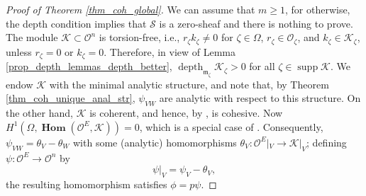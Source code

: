 \documentclass{amsart}
\numberwithin{equation}{section}
\theoremstyle{definition}
\theoremstyle{plain}
\theoremstyle{remark}
\begin{document}
\begin{proof}[Proof of Theorem \ref{thm_coh_global}]
We can assume that $m\geq 1$, for otherwise, the depth condition implies that ${\ensuremath{\mathcal{{S}}}}$ is a zero-sheaf and there is
nothing to prove.
The module 
${\ensuremath{\mathcal{{K}}}}\subset{\ensuremath{\mathcal{{O}}}}^n$ is torsion-free, i.e., 
$r_\zeta k_\zeta\not=0$
for $\zeta\in\Omega$, $r_\zeta\in{\ensuremath{\mathcal{{O}}}}_\zeta$, and $k_\zeta\in{\ensuremath{\mathcal{{K}}}}_\zeta$,
unless $r_\zeta=0$ or $k_\zeta=0$. Therefore, 
in view of 
Lemma \ref{prop_depth_lemmas_depth_better},
${\mathop{\mathrm{depth}}\nolimits _{{{{\mathop{\mathfrak{m}}}}_\zeta}}} {\ensuremath{\mathcal{{K}}}}_\zeta>0$ for all $\zeta\in{\mathop{\mathrm{supp}}} {\ensuremath{\mathcal{{K}}}}$.
We endow ${\ensuremath{\mathcal{{K}}}}$ with the minimal analytic structure, and note that, 
 by Theorem 
\ref{thm_coh_unique_anal_str},
$\psi_{VW}$ are analytic with respect to this structure.
On the other hand, ${\ensuremath{\mathcal{{K}}}}$ is coherent, and hence, by \cite[Theorem 4.3]{Lempert}, is cohesive. 
Now
$H^1(\Omega,{{\mathop{\mathbf{Hom}}}}({\ensuremath{\mathcal{{O}}}}^E,{\ensuremath{\mathcal{{K}}}}))=0$,
which is a special case of \cite[Theorem 9.1]{LP}.
Consequently,
$\psi_{VW}=\theta_V-\theta_W$ with some (analytic)
homomorphisms $\theta_V:{\ensuremath{\mathcal{{O}}}}^E|_V\rightarrow{\ensuremath{\mathcal{{K}}}}|_V$;
defining $\psi:{\ensuremath{\mathcal{{O}}}}^E\rightarrow{\ensuremath{\mathcal{{O}}}}^n$ by
\[
	\psi|_V=\psi_V-\theta_V,
\]
the resulting homomorphism satisfies $\phi=p\psi$.
\end{proof}



\end{document}
